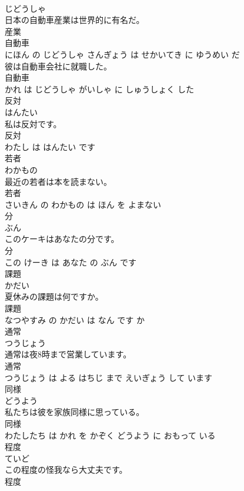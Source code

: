 \documentclass[8pt]{extreport}
\begin{document}
\begin{CJK}{UTF8}{min}
\\	じどうしゃ			
\\	日本の自動車産業は世界的に有名だ。	
\\	産業 
\\	自動車 
\\	にほん の じどうしゃ さんぎょう は せかいてき に ゆうめい だ			
\\	彼は自動車会社に就職した。	
\\	自動車 
\\	かれ は じどうしゃ がいしゃ に しゅうしょく した			
\\	反対	
\\	はんたい			
\\	私は反対です。	
\\	反対 
\\	わたし は はんたい です			
\\	若者	
\\	わかもの			
\\	最近の若者は本を読まない。	
\\	若者 
\\	さいきん の わかもの は ほん を よまない			
\\	分	
\\	ぶん			
\\	このケーキはあなたの分です。	
\\	分 
\\	この けーき は あなた の ぶん です			
\\	課題	
\\	かだい			
\\	夏休みの課題は何ですか。	
\\	課題 
\\	なつやすみ の かだい は なん です か			
\\	通常	
\\	つうじょう			
\\	通常は夜8時まで営業しています。	
\\	通常 
\\	つうじょう は よる はちじ まで えいぎょう して います			
\\	同様	
\\	どうよう			
\\	私たちは彼を家族同様に思っている。	
\\	同様 
\\	わたしたち は かれ を かぞく どうよう に おもって いる			
\\	程度	
\\	ていど			
\\	この程度の怪我なら大丈夫です。	
\\	程度 

\end{CJK}
\end{document}
